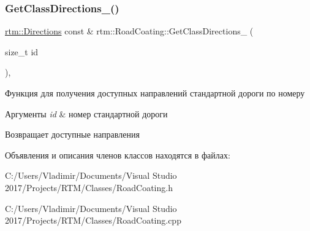 \subsubsection{\texorpdfstring{Get\+Class\+Directions\+\_\+()}{GetClassDirections\_()}}
{\footnotesize\ttfamily \hyperlink{namespacertm_a4776fbfe59834ff1a16838ad6735b69a}{rtm\+::\+Directions} const  \& rtm\+::\+Road\+Coating\+::\+Get\+Class\+Directions\+\_\+ (\begin{DoxyParamCaption}\item[{size\+\_\+t}]{id }\end{DoxyParamCaption})\hspace{0.3cm}{\ttfamily [static]}, {\ttfamily [private]}}



Функция для получения доступных направлений стандартной дороги по номеру 


\begin{DoxyParams}{Аргументы}
{\em id} & номер стандартной дороги \\
\hline
\end{DoxyParams}
\begin{DoxyReturn}{Возвращает}
доступные направления 
\end{DoxyReturn}


Объявления и описания членов классов находятся в файлах\+:\begin{DoxyCompactItemize}
\item 
C\+:/\+Users/\+Vladimir/\+Documents/\+Visual Studio 2017/\+Projects/\+R\+T\+M/\+Classes/Road\+Coating.\+h\item 
C\+:/\+Users/\+Vladimir/\+Documents/\+Visual Studio 2017/\+Projects/\+R\+T\+M/\+Classes/Road\+Coating.\+cpp\end{DoxyCompactItemize}

